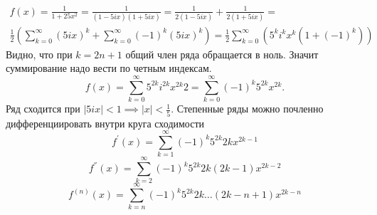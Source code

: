 \documentclass[12pt,a4paper]{article}
\begin{document}
	
	\begin{equation}
	\begin{split}
	f(x) = \frac{1}{1 + 25x^2} = \frac{1}{(1-5ix)(1+5ix)} = \frac{1}{2(1-5ix)} + \frac{1}{2(1+5ix)} = \\ \frac{1}{2} (\sum_{k=0}^\infty(5ix)^k + \sum_{k=0}^\infty(-1)^k(5ix)^k) = \frac{1}{2}\sum_{k=0}^\infty(5^k i^k x^k (1 + (-1)^k))
	\end{split}
	\end{equation}
Видно, что при $k = 2n+1$ общий член ряда обращается в ноль. Значит суммирование надо вести по четным индексам.
\begin{equation}
f(x)  = \sum_{k=0}^\infty5^{2k} i^{2k} x^{2k}  2 = \sum_{k=0}^\infty(-1)^k5^{2k} x^{2k}.
\end{equation}
Ряд сходится при $ |5ix|< 1 \implies |x| < \frac{1}{5} $.
Степенные ряды можно почленно дифференциировать внутри круга сходимости
\begin{equation}
f^{ ' }(x) = \sum_{k=1}^\infty (-1)^k 5^{2k} 2k x^{2k-1}
\end{equation}
\begin{equation}
f^{ '' }(x) = \sum_{k=2}^\infty (-1)^k 5^{2k} 2k(2k-1) x^{2k-2}
\end{equation}
\begin{equation}
f^{ (n) }(x) = \sum_{k=n}^\infty (-1)^k 5^{2k} 2k  \ldots (2k - n + 1) x^{2k - n}
\end{equation}
\end{document}

